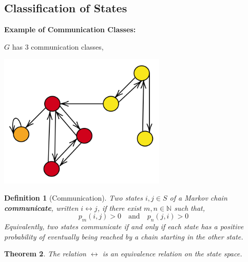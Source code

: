 \documentclass{tufte-handout}
\newtheorem{thm}{Theorem}
\newtheorem{defn}[thm]{Definition}
\begin{document}
  \subsection{Classification of States}
  \begin{marginfigure}
    \textbf{Example of Communication Classes:}

    \noindent $G$ has 3 communication classes,
    \begin{center}
    \includegraphics[width=0.6\textwidth]{fig-2.png}
    \end{center}
    
  \end{marginfigure}

  \begin{defn}[Communication]
    Two states $i, j \in S$ of a Markov chain \textbf{communicate}, written $i \leftrightarrow j$, if there exist $m, n \in \mathbb{N}$ such that,
    \[p_m(i,j) > 0 \quad \text{and} \quad p_n(j,i) > 0\]
    \noindent Equivalently, two states communicate if and only if each state has a positive probability of eventually being reached by a chain starting in the other state.
  \end{defn}

  \begin{thm}
    The relation $\leftrightarrow$ is an equivalence relation on the state space.
  \end{thm}
\end{document}
